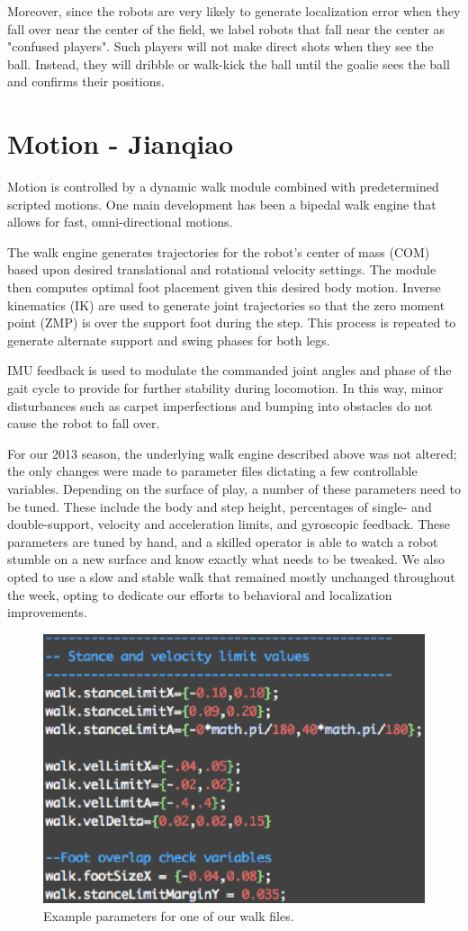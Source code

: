 \documentclass{article}
\begin{document}
	  Moreover, since the robots are very likely to generate localization error when they fall over near the center of the field, we label robots that fall near the center as "confused players". Such players will not make direct shots when they see the ball. Instead, they will dribble or walk-kick the ball until the goalie sees the ball and confirms their positions.



\section{Motion - Jianqiao}
	Motion is controlled by a dynamic walk module combined with predetermined scripted motions. One main development has been a bipedal walk engine that allows for fast, omni-directional motions.

	The walk engine generates trajectories for the robot's center of mass (COM) based upon desired translational and rotational velocity settings. The module then computes optimal foot placement given this desired body motion. Inverse kinematics (IK) are used to generate joint trajectories so that the zero moment point (ZMP) is over the support foot during the step. This process is repeated to generate alternate support and swing phases for both legs.

	IMU feedback is used to modulate the commanded joint angles and phase of the gait cycle to provide for further stability during locomotion. In this way, minor disturbances such as carpet imperfections and bumping into obstacles do not cause the robot to fall over.

	For our 2013 season, the underlying walk engine described above was not altered; the only changes were made to parameter files dictating a few controllable variables. Depending on the surface of play, a number of these parameters need to be tuned. These include the body and step height, percentages of single- and double-support, velocity and acceleration limits, and gyroscopic feedback. These parameters are tuned by hand, and a skilled operator is able to watch a robot stumble on a new surface and know exactly what needs to be tweaked. We also opted to use a slow and stable walk that remained mostly unchanged throughout the week, opting to dedicate our efforts to behavioral and localization improvements.

	\begin{figure}[H]
		\centering
		\includegraphics[width=.60\textwidth]{figures/WalkFile.eps}
		\caption{Example parameters for one of our walk files.}
	\end{figure}
\end{document}
